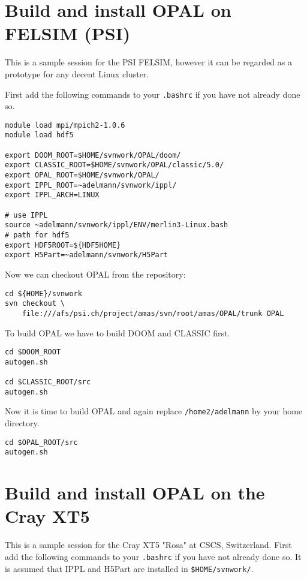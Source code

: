 \section{Build and install OPAL on FELSIM (PSI)}
This is a sample session for the PSI FELSIM, however it can be regarded as a prototype for any decent Linux cluster. 

First add the following commands to your {\tt .bashrc} if you have not already  done so. 
\begin{footnotesize}
\begin{verbatim}
module load mpi/mpich2-1.0.6
module load hdf5

export DOOM_ROOT=$HOME/svnwork/OPAL/doom/
export CLASSIC_ROOT=$HOME/svnwork/OPAL/classic/5.0/
export OPAL_ROOT=$HOME/svnwork/OPAL/
export IPPL_ROOT=~adelmann/svnwork/ippl/
export IPPL_ARCH=LINUX

# use IPPL 
source ~adelmann/svnwork/ippl/ENV/merlin3-Linux.bash
# path for hdf5
export HDF5ROOT=${HDF5HOME}
export H5Part=~adelmann/svnwork/H5Part
\end{verbatim}
\end{footnotesize}
Now we can checkout OPAL from the repository: 
\begin{footnotesize}
\begin{verbatim}
cd ${HOME}/svnwork
svn checkout \
    file:///afs/psi.ch/project/amas/svn/root/amas/OPAL/trunk OPAL
\end{verbatim}
\end{footnotesize}
To build OPAL we have to build DOOM and CLASSIC first.
\begin{footnotesize}
\begin{verbatim}
cd $DOOM_ROOT
autogen.sh

cd $CLASSIC_ROOT/src
autogen.sh
\end{verbatim}
\end{footnotesize}
Now it is time to build OPAL and again replace {\tt /home2/adelmann} by your home directory.
\begin{footnotesize}
\begin{verbatim}
cd $OPAL_ROOT/src
autogen.sh
\end{verbatim}
\end{footnotesize}

\section{Build and install OPAL on the Cray XT5}
This is a sample session for the Cray XT5 "Rosa" at CSCS, Switzerland. First add the following commands to your {\tt .bashrc} if
you have not already done so. It is assumed that IPPL and H5Part are installed in {\tt \${HOME}/svnwork/}.


